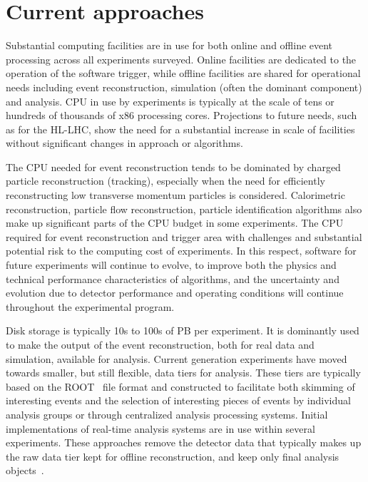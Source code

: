 \section{Current approaches}
  
Substantial computing facilities are in use for both online and offline event processing across all experiments surveyed. Online facilities are dedicated to the operation of the software trigger, while offline facilities are shared for operational needs including event reconstruction, simulation (often the dominant component) and analysis. CPU in use by experiments is typically at the scale of tens or hundreds of thousands of x86 processing cores. Projections to future needs, such as for the HL-LHC, show the need for a substantial increase in scale of facilities without significant changes in approach or algorithms.

The CPU needed for event reconstruction tends to be dominated by charged particle reconstruction (tracking), especially when the need for efficiently reconstructing low transverse momentum particles is considered. Calorimetric reconstruction, particle flow reconstruction, particle identification algorithms also make up significant parts of the CPU budget in some experiments. The CPU required for event reconstruction and trigger area with challenges and substantial potential risk to the computing cost of experiments. In this respect, software for future experiments will continue to evolve, to improve both the physics and technical performance characteristics of algorithms, and the uncertainty and evolution due to detector performance and operating conditions will continue throughout the experimental program.

Disk storage is typically 10s to 100s of PB per experiment. It is dominantly used to make the output of the event reconstruction, both for real data and simulation, available for analysis. Current generation experiments have moved towards smaller, but still flexible, data tiers for analysis. These tiers are typically based on the ROOT~\cite{Brun1996} file format and constructed to facilitate both skimming of interesting events and the selection of interesting pieces of events by individual analysis groups or through centralized analysis processing systems. Initial implementations of real-time analysis systems are in use within several experiments. These approaches remove the detector data that typically makes up the raw data tier kept for offline reconstruction, and keep only final analysis objects~\cite{Aaij2016,ATLAS2017,CMS2016}.

